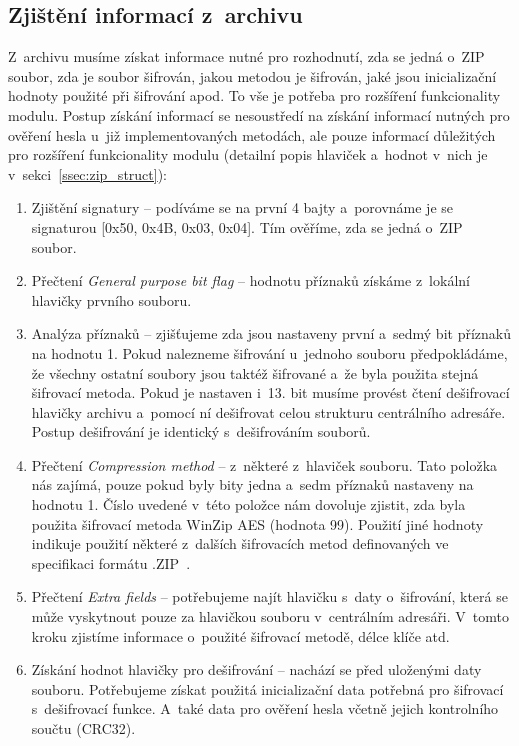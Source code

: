 \subsection{Zjištění informací z~archivu}
Z~archivu musíme získat informace nutné pro rozhodnutí, zda se jedná o~ZIP soubor, zda je soubor
šifrován, jakou metodou je šifrován, jaké jsou inicializační hodnoty použité při šifrování apod. To
vše je potřeba pro rozšíření funkcionality modulu. Postup získání informací se nesoustředí na
získání informací nutných pro ověření hesla u~již implementovaných metodách, ale pouze informací
důležitých pro rozšíření funkcionality modulu (detailní popis hlaviček a~hodnot v~nich je
v~sekci~\ref{ssec:zip_struct}):
\begin{enumerate}
    \item Zjištění signatury -- podíváme se na první 4 bajty a~porovnáme je se signaturou [0x50,
	0x4B, 0x03, 0x04]. Tím ověříme, zda se jedná o~ZIP soubor.
    \item Přečtení {\it General purpose bit flag} -- hodnotu příznaků získáme z~lokální hlavičky
	prvního souboru.
    \item Analýza příznaků -- zjišťujeme zda jsou nastaveny první a~sedmý bit příznaků na hodnotu
	1. Pokud nalezneme šifrování u~jednoho souboru předpokládáme, že všechny ostatní soubory
	jsou taktéž šifrované a~že byla použita stejná šifrovací metoda. Pokud je nastaven i~13.
	bit musíme provést čtení dešifrovací hlavičky archivu a~pomocí ní dešifrovat celou
	strukturu centrálního adresáře. Postup dešifrování je identický s~dešifrováním souborů.
    \item Přečtení {\it Compression method} -- z~některé z~hlaviček %
	souboru. Tato položka nás zajímá, pouze pokud byly bity jedna a~sedm příznaků nastaveny na
	hodnotu 1. Číslo uvedené v~této položce nám dovoluje zjistit, zda byla použita šifrovací
	metoda WinZip AES (hodnota 99). Použití jiné hodnoty indikuje použití některé z~dalších
	šifrovacích metod definovaných ve specifikaci formátu .ZIP~\cite{PKWARE:2014}.
    \item Přečtení {\it Extra fields} -- potřebujeme najít hlavičku s~daty o~šifrování, která se
	může vyskytnout pouze za hlavičkou souboru v~centrálním adresáři. V~tomto kroku zjistíme
	informace o~použité šifrovací metodě, délce klíče atd.
    \item Získání hodnot hlavičky pro dešifrování -- nachází se před uloženými daty souboru.
	Potřebujeme získat použitá inicializační data potřebná pro šifrovací s~dešifrovací funkce.
	A~také data pro ověření hesla včetně jejich kontrolního součtu (CRC32).
\end{enumerate}

